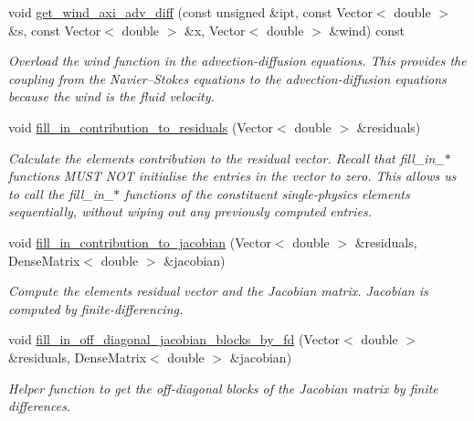 \begin{DoxyCompactItemize}
void \hyperlink{classoomph_1_1AxisymmetricQAdvectionCrouzeixRaviartElement_a820f9ee2e2033c005154c75cfe999d66}{get\+\_\+wind\+\_\+axi\+\_\+adv\+\_\+diff} (const unsigned \&ipt, const Vector$<$ double $>$ \&s, const Vector$<$ double $>$ \&x, Vector$<$ double $>$ \&wind) const
\begin{DoxyCompactList}\small\item\em Overload the wind function in the advection-\/diffusion equations. This provides the coupling from the Navier--Stokes equations to the advection-\/diffusion equations because the wind is the fluid velocity. \end{DoxyCompactList}\item 
void \hyperlink{classoomph_1_1AxisymmetricQAdvectionCrouzeixRaviartElement_a74e05eb28d4674c636827d450c7e03f9}{fill\+\_\+in\+\_\+contribution\+\_\+to\+\_\+residuals} (Vector$<$ double $>$ \&residuals)
\begin{DoxyCompactList}\small\item\em Calculate the element\textquotesingle{}s contribution to the residual vector. Recall that fill\+\_\+in\+\_\+$\ast$ functions M\+U\+ST N\+OT initialise the entries in the vector to zero. This allows us to call the fill\+\_\+in\+\_\+$\ast$ functions of the constituent single-\/physics elements sequentially, without wiping out any previously computed entries. \end{DoxyCompactList}\item 
void \hyperlink{classoomph_1_1AxisymmetricQAdvectionCrouzeixRaviartElement_a89c5d3e012d9a8ca36e4e54fd26197b8}{fill\+\_\+in\+\_\+contribution\+\_\+to\+\_\+jacobian} (Vector$<$ double $>$ \&residuals, Dense\+Matrix$<$ double $>$ \&jacobian)
\begin{DoxyCompactList}\small\item\em Compute the element\textquotesingle{}s residual vector and the Jacobian matrix. Jacobian is computed by finite-\/differencing. \end{DoxyCompactList}\item 
void \hyperlink{classoomph_1_1AxisymmetricQAdvectionCrouzeixRaviartElement_aad2c85645b11da350f13cf1087f5b46a}{fill\+\_\+in\+\_\+off\+\_\+diagonal\+\_\+jacobian\+\_\+blocks\+\_\+by\+\_\+fd} (Vector$<$ double $>$ \&residuals, Dense\+Matrix$<$ double $>$ \&jacobian)
\begin{DoxyCompactList}\small\item\em Helper function to get the off-\/diagonal blocks of the Jacobian matrix by finite differences. \end{DoxyCompactList}\item 

\end{DoxyCompactItemize}
